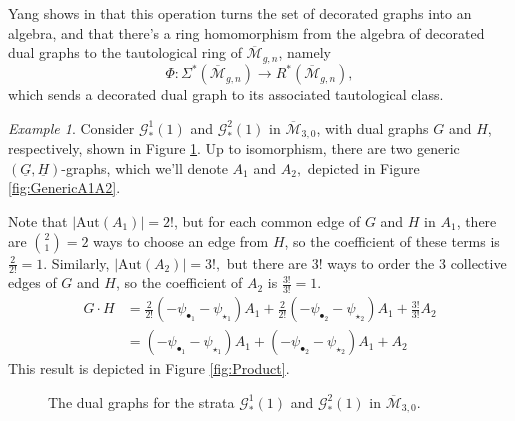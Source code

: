 \documentclass[leqno,12pt]{amsart}
\theoremstyle{remark}
\newtheorem{example}[theorem]{Example}
\numberwithin{equation}{section}
\begin{document}
Yang shows in \cite{Yang} that this operation turns the set of decorated graphs into an algebra, and that there's a ring homomorphism from the algebra of decorated dual graphs to the tautological ring of $\overline{\mathcal{M}}_{g,n}$, namely 
\begin{equation}\label{eq: Yang}
    \Phi : \Sigma^\ast(\overline{\mathcal{M}}_{g, n}) \rightarrow R^\ast(\overline{\mathcal{M}}_{g, n}), 
\end{equation}
which sends a decorated dual graph to its associated tautological class.

\begin{example}
Consider $\mathcal{G}_*^1(1)$ and $\mathcal{G}_*^2(1)$ in $\overline{\mathcal{M}}_{3, 0}$, with dual graphs $G$ and $H$, respectively, shown in Figure \ref{fig:2dualG1G2}. Up to isomorphism, there are two generic $(\underline{G}, \underline{H})$-graphs, which we'll denote $A_1$ and $A_2,$ depicted in Figure \ref{fig:GenericA1A2}.

Note that $|\text{Aut}(A_1)| = 2!$, but for each common edge of $G$ and $H$ in $A_1$, there are $\binom{2}{1} = 2$ ways to choose an edge from $H$, so the coefficient of these terms is $\frac{2}{2!} = 1.$ Similarly, $|\text{Aut}(A_2)| = 3!,$ but there are $3!$ ways to order the $3$ collective edges of $G$ and $H$, so the coefficient of $A_2$ is $\frac{3!}{3!} = 1.$ 
\begin{align*}
    G \cdot H &= \frac{2}{2!}(-\psi_{\bullet_1} - \psi_{\star_1})A_1 + \frac{2}{2!}(-\psi_{\bullet_2} - \psi_{\star_2})A_1 + \frac{3!}{3!}A_2\\
    &= (-\psi_{\bullet_1} - \psi_{\star_1})A_1 + (-\psi_{\bullet_2} - \psi_{\star_2})A_1 + A_2
\end{align*}
This result is depicted in Figure \ref{fig:Product}.


\begin{figure}[tb]
    \centering
\begin{center}
\end{center}
    \caption{The dual graphs for the strata $\mathcal{G}_*^1(1)$ and $\mathcal{G}_*^2(1)$ in $\overline{\mathcal{M}}_{3, 0}$. }
    \label{fig:2dualG1G2}
\end{figure}


\end{example}
\end{document}
